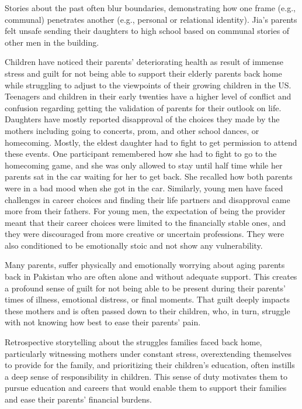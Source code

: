  Stories about the past often blur boundaries, demonstrating how one frame (e.g., communal) penetrates another (e.g., personal or relational identity). Jia’s parents felt unsafe sending their daughters to high school based on communal stories of other men in the building.
 
Children have noticed their parents' deteriorating health as result of immense stress and guilt for not being able to support their elderly parents back home while struggling to adjust to the viewpoints of their growing children in the US. Teenagers and children in their early twenties have a higher level of conflict and confusion regarding getting the validation of parents for their outlook on life. Daughters have mostly reported disapproval of the choices they made by the mothers including going to concerts, prom, and other school dances, or homecoming. Mostly, the eldest daughter had to fight to get permission to attend these events. One participant remembered how she had to fight to go to the homecoming game, and she was only allowed to stay until half time while her parents sat in the car waiting for her to get back. She recalled how both parents were in a bad mood when she got in the car. Similarly, young men have faced challenges in career choices and finding their life partners and disapproval came more from their fathers. For young men, the expectation of being the provider meant that their career choices were limited to the financially stable ones, and they were discouraged from more creative or uncertain professions. They were also conditioned to be emotionally stoic and not show any vulnerability.

Many parents, suffer physically and emotionally worrying about aging parents back in Pakistan who are often alone and without adequate support. This creates a profound sense of guilt for not being able to be present during their parents’ times of illness, emotional distress, or final moments. That guilt deeply impacts these mothers and is often passed down to their children, who, in turn, struggle with not knowing how best to ease their parents’ pain.

Retrospective storytelling about the struggles families faced back home, particularly witnessing mothers under constant stress, overextending themselves to provide for the family, and prioritizing their children’s education, often instills a deep sense of responsibility in children. This sense of duty motivates them to pursue education and careers that would enable them to support their families and ease their parents’ financial burdens.

